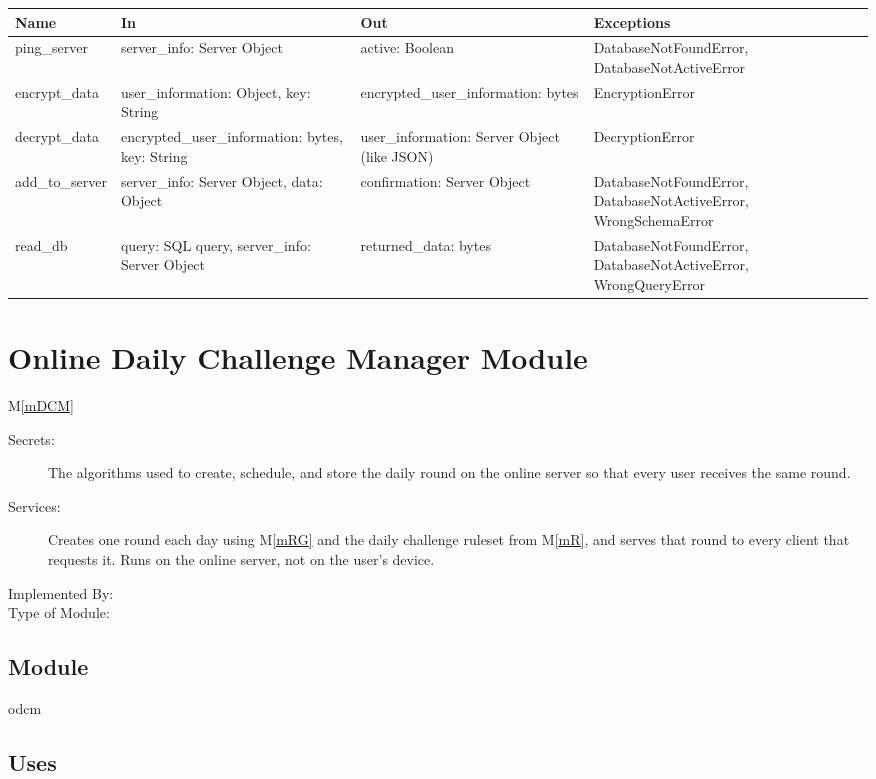 \documentclass[12pt, titlepage]{article}
\newcommand{\mref}[1]{M\ref{#1}}
\begin{document}
\begin{center}
\begin{tabular}{p{4cm} p{4cm} p{4cm} p{4cm}}
\hline
\textbf{Name} & \textbf{In} & \textbf{Out} & \textbf{Exceptions} \\
\hline
ping\_server & server\_info: Server Object & active: Boolean & DatabaseNotFoundError, DatabaseNotActiveError \\
encrypt\_data & user\_information: Object, key: String & encrypted\_user\_information: bytes & EncryptionError \\
decrypt\_data & encrypted\_user\_information: bytes, key: String & user\_information: Server Object (like JSON) & DecryptionError \\
add\_to\_server & server\_info: Server Object, data: Object & confirmation: Server Object & DatabaseNotFoundError, DatabaseNotActiveError, WrongSchemaError \\ 
read\_db & query: SQL query, server\_info: Server Object  & returned\_data: bytes & DatabaseNotFoundError, DatabaseNotActiveError, WrongQueryError \\
\hline
\end{tabular}
\end{center}


\newpage

\section{Online Daily Challenge Manager Module} \mref{mDCM} 


\begin{description}
\item[Secrets:] The algorithms used to create, schedule, and store the daily round on the online server so that every user receives the same round.
\item[Services:] Creates one round each day using \mref{mRG} and the daily challenge ruleset from \mref{mR}, and serves that round to every client that requests it. Runs on the online server, not on the user's device.
\item[Implemented By:]
\item[Type of Module:]
\end{description}

\subsection{Module}

odcm

\subsection{Uses}
\end{document}

